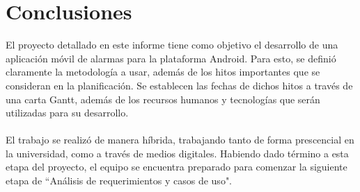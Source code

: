 \section{Conclusiones}
El proyecto detallado en este informe tiene como objetivo el desarrollo de una aplicación móvil de alarmas para la plataforma Android. Para esto, se definió claramente la metodología a usar, además de los hitos importantes que se consideran en la planificación. Se establecen las fechas de dichos hitos a través de una carta Gantt, además de los recursos humanos y tecnologías que serán utilizadas para su desarrollo.
\\\\
El trabajo se realizó de manera híbrida, trabajando tanto de forma prescencial en la universidad, como a través de medios digitales. Habiendo dado término a esta etapa del proyecto, el equipo se encuentra preparado para comenzar la siguiente etapa de ``Análisis de requerimientos y casos de uso".

\clearpage
